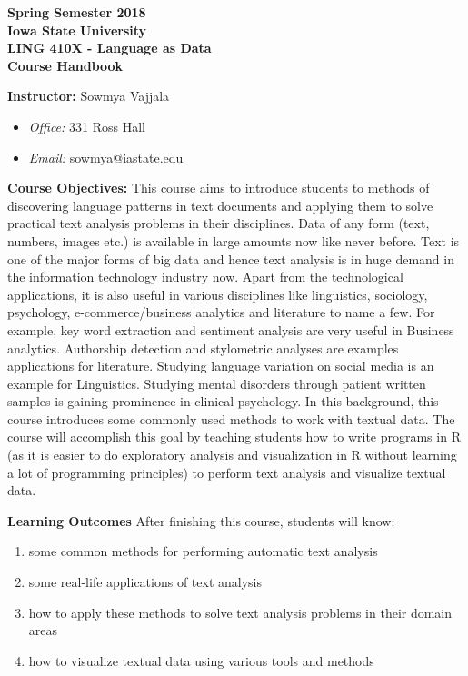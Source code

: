 \documentclass[11pt,a4paper]{article}
\begin{document}
\begin{center}
  \textbf{Spring Semester 2018 \\ Iowa State University\\[3ex]
  {\Large LING 410X - Language as Data}\\[3ex]
  Course Handbook
}
\end{center}

\bigskip
\textbf{\large Instructor:}
  Sowmya Vajjala
  \begin{itemize}\vspace*{-.4\baselineskip}\itemsep-.4ex
  \item \textit{Office:} 331 Ross Hall
  \item \textit{Email:} sowmya@iastate.edu
\end{itemize}

\textbf{\large Course Objectives:}
This course aims to introduce students to methods of discovering language patterns in text documents and applying them to solve practical text analysis problems in their disciplines. Data of any form (text, numbers, images etc.) is available in large amounts now like never before. Text is one of the major forms of big data and hence text analysis is in huge demand in the information technology industry now. Apart from the technological applications, it is also useful in various disciplines like linguistics, sociology, psychology, e-commerce/business analytics and literature to name a few. For example, key word extraction and sentiment analysis are very useful in Business analytics. Authorship detection and stylometric analyses are examples applications for literature. Studying language variation on social media is an example for Linguistics. Studying mental disorders through patient written samples is gaining prominence in clinical psychology. In this background, this course introduces some commonly used methods to work with textual data. The course will accomplish this goal by teaching students how to write programs in R (as it is easier to do exploratory analysis and visualization in R without learning a lot of programming principles) to perform text analysis and visualize textual data. 

\bigskip\textbf{\large Learning Outcomes}
After finishing this course, students will know:
\begin{enumerate}
\item some common methods for performing automatic text analysis
\item some real-life applications of text analysis
\item how to apply these methods to solve text analysis problems in their domain areas
\item how to visualize textual data using various tools and methods
\end{enumerate}
\end{document}
